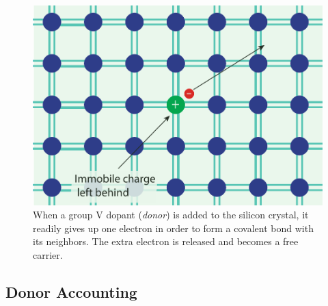 \begin{figure}[tb]
\begin{center}
\includegraphics[width=.5\columnwidth]{silicon_dopant_V}
\end{center}
\caption{When a group V dopant (\emph{donor}) is added to the silicon crystal, it readily gives up one electron in order to form a covalent bond with its neighbors.  The extra electron is released and becomes a free carrier. } \label{fig:silicon_dopant_V}
\end{figure}






\subsection{Donor Accounting}


